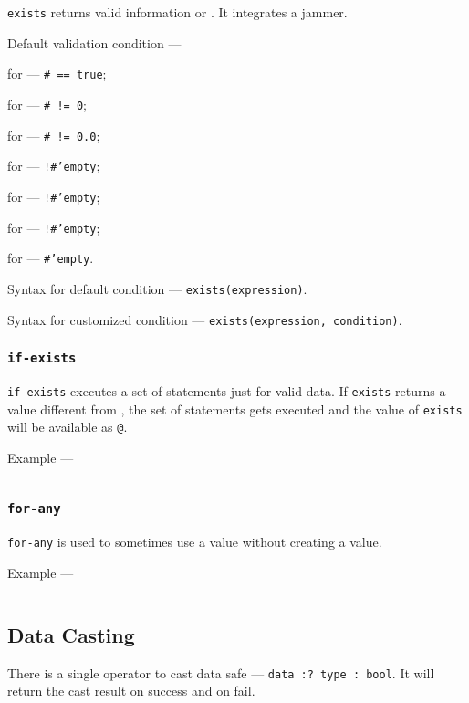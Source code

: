 \texttt{exists} returns valid information or \void. It integrates a jammer. 

Default validation condition —
\begin{icItems}
	\item
	for \bool{} — \texttt{# == true};
	\item
	for \integer{} — \texttt{# != 0};
	\item
	for \double{} — \texttt{# != 0.0};
	\item
	for \str{} — \texttt{!#'empty};
	\item
	for \listtype{} — \texttt{!#'empty};
	\item
	for \set{} — \texttt{!#'empty};
	\item
	for \element{} — \texttt{#'empty}.
\end{icItems}

Syntax for default condition —
\texttt{exists(expression)}.

Syntax for customized condition —
\texttt{exists(expression, condition)}.

\subsubsection{\texttt{if-exists}}

\texttt{if-exists} executes a set of statements just for valid data. If \texttt{exists} returns a value different from \void, the set of statements gets executed and the value of \texttt{exists} will be available as \texttt{@}.

Example —
\inputminted[linenos]{icl}{../sources/ifexistsex.icL}

\subsubsection{\texttt{for-any}}

\texttt{for-any} is used to sometimes use a value without creating a value.

Example —
\inputminted[linenos]{icl}{../sources/foranyex.icL}

\subsection{Data Casting}

There is a single operator to cast data safe — \texttt{data :? type : bool}. It will return the cast result on success and \void{} on fail.

